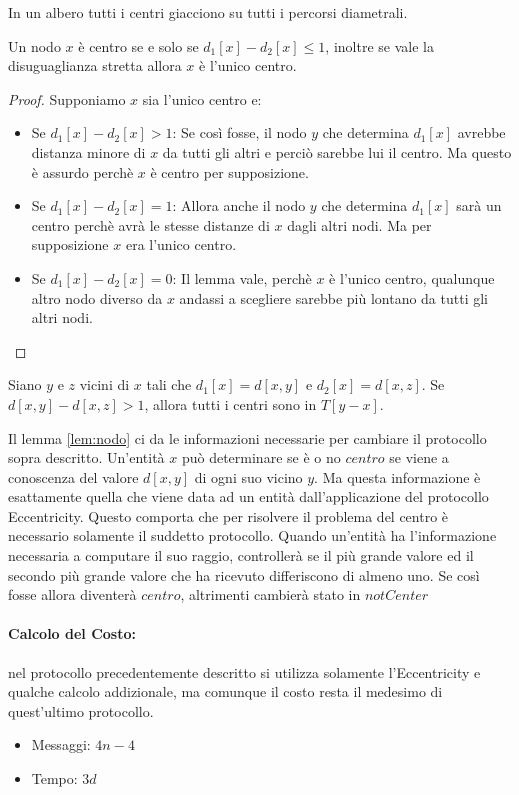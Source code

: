 \begin{lemma}
    In un albero tutti i centri giacciono su tutti i percorsi diametrali.
\end{lemma}

\begin{lemma}\label{lem:nodo}
    Un nodo $x$ è centro se e solo se $d_1[x]-d_2[x]\leq 1$, inoltre
    se vale la disuguaglianza stretta allora $x$ è l'unico centro.
\end{lemma}

\begin{proof}
    Supponiamo $x$ sia l'unico centro e:
    \begin{itemize}
        \item Se $d_1[x]-d_2[x] > 1$: Se così fosse, il nodo $y$ che determina
              $d_1[x]$ avrebbe distanza minore di $x$ da tutti gli altri e perciò sarebbe
              lui il centro. Ma questo è assurdo perchè $x$ è centro per supposizione.
        \item Se $d_1[x]-d_2[x] = 1$: Allora anche il nodo $y$ che determina $d_1[x]$
              sarà un centro perchè avrà le stesse distanze di $x$ dagli altri nodi. Ma per
              supposizione $x$ era l'unico centro.
        \item Se $d_1[x]-d_2[x] = 0$: Il lemma vale, perchè $x$ è l'unico centro,
              qualunque altro nodo diverso da $x$ andassi a scegliere sarebbe più lontano da
              tutti gli altri nodi.
    \end{itemize}
\end{proof}

\begin{lemma}
    Siano $y$ e $z$ vicini di $x$ tali che $d_1[x] = d[x, y]$ e $d_2 [x] = d[x,
                z]$. Se $d[x, y] - d[x, z] > 1$, allora tutti i centri sono in $T [y - x]$.
\end{lemma}

Il lemma \ref{lem:nodo} ci da le informazioni necessarie per cambiare il protocollo sopra
descritto. Un'entità $x$ può determinare se è o no $centro$ se viene a
conoscenza del valore $d[x,y]$ di ogni suo vicino $y$. Ma questa informazione è
esattamente quella che viene data ad un entità dall'applicazione del protocollo
Eccentricity. Questo comporta che per risolvere il problema del centro è
necessario solamente il suddetto protocollo. Quando un'entità ha l'informazione
necessaria a computare il suo raggio, controllerà se il più grande valore ed il
secondo più grande valore che ha ricevuto differiscono di almeno uno. Se così
fosse allora diventerà $centro$, altrimenti cambierà stato in $notCenter$

\paragraph{Calcolo del Costo:}
nel protocollo precedentemente descritto si utilizza solamente l'Eccentricity e
qualche calcolo addizionale, ma comunque il costo resta il medesimo di
quest'ultimo protocollo.
\begin{itemize}
    \item Messaggi: $4n - 4$
    \item Tempo: $3d$
\end{itemize}
